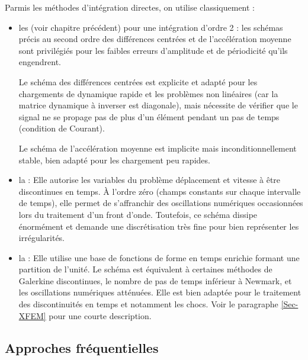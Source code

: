 Parmis les méthodes d'intégration directes, on utilise classiquement :
\begin{itemize}
	\item les  (voir chapitre précédent) pour une intégration d'ordre 2 :
		les schémas précis au second ordre des différences centrées et de
		l'accélération moyenne sont privilégiés pour les faibles erreurs d'amplitude
		et de périodicité qu'ils engendrent.
		
		Le schéma des différences centrées
		est explicite et adapté pour les chargements de dynamique rapide et les
		problèmes non linéaires (car la matrice dynamique à inverser est diagonale),
		mais nécessite de vérifier que le signal ne se propage pas de plus d'un élément
		pendant un pas de temps (condition de Courant).
		
		Le schéma de l'accélération moyenne est implicite mais inconditionnellement
		stable, bien adapté pour les chargement peu rapides.
	\item la :
		Elle autorise les variables du problème déplacement et vitesse à être
		discontinues en temps.
		À l'ordre zéro (champs constants sur chaque intervalle de temps), elle permet
		de s'affranchir des oscillations numériques occasionnées lors du traitement
		d'un front d'onde.
		Toutefois, ce schéma dissipe énormément et demande une discrétisation
		très fine pour bien représenter les irrégularités.
	\item la :
		Elle utilise une base de fonctions de forme en temps enrichie formant une partition de l'unité.
		Le schéma est équivalent à certaines méthodes de Galerkine discontinues, le nombre de
		pas de temps inférieur à Newmark, et les oscillations numériques atténuées.
		Elle est bien adaptée pour le traitement des discontinuités en temps et
		notamment les chocs. Voir le paragraphe \ref{Sec-XFEM} pour une courte description.
\end{itemize}

\medskip
\subsection{Approches fréquentielles}

